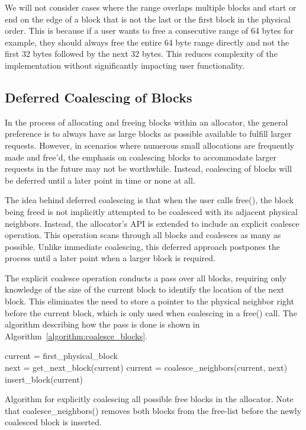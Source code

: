 We will not consider cases where the range overlaps multiple blocks and start or end on the edge of a block that is not the last or the first block in the physical order. This is because if a user wants to free a consecutive range of 64 bytes for example, they should always free the entire 64 byte range directly and not the first 32 bytes followed by the next 32 bytes. This reduces complexity of the implementation without significantly impacting user functionality.

\subsection{Deferred Coalescing of Blocks}

In the process of allocating and freeing blocks within an allocator, the general preference is to always have as large blocks as possible available to fulfill larger requests. However, in scenarios where numerous small allocations are frequently made and free'd, the emphasis on coalescing blocks to accommodate larger requests in the future may not be worthwhile. Instead, coalescing of blocks will be deferred until a later point in time or none at all.

The idea behind deferred coalescing is that when the user calls free(), the block being freed is not implicitly attempted to be coalesced with its adjacent physical neighbors. Instead, the allocator's API is extended to include an explicit coalesce operation. This operation scans through all blocks and coalesces as many as possible. Unlike immediate coalescing, this deferred approach postpones the process until a later point when a larger block is required.

The explicit coalesce operation conducts a pass over all blocks, requiring only knowledge of the size of the current block to identify the location of the next block. This eliminates the need to store a pointer to the physical neighbor right before the current block, which is only used when coalescing in a free() call. The algorithm describing how the pass is done is shown in Algorithm~\ref{algorithm:coalesce_blocks}.

\begin{algorithm}[H]
current = first\_physical\_block\\
 {
next = get\_next\_block(current)\;
 {
    current = coalesce\_neighbors(current, next)\;
    insert\_block(current)\;
}
}
\label{algorithm:coalesce_blocks}
\caption{Algorithm for explicitly coalescing all possible free blocks in the allocator. Note that coalesce\_neighbors() removes both blocks from the free-list before the newly coalesced block is inserted.}
\end{algorithm}

